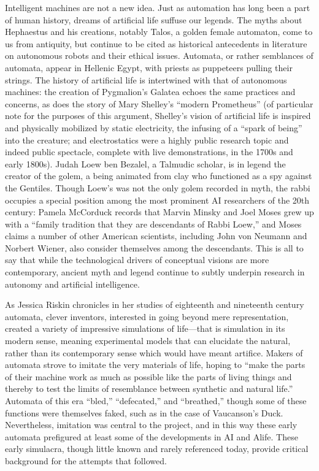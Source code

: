 Intelligent machines are not a new idea. Just as automation has long
been a part of human history, dreams of artificial life suffuse our
legends. The myths about Hephaestus and
his creations, notably Talos, a golden female automaton, come to us
from antiquity,\cite[Ch. 1]{mccorduck}  but continue to be cited as historical antecedents in
literature on autonomous robots and their ethical issues.\cite[p. 3]{patricklin} Automata,
or rather semblances of automata, appear in Hellenic Egypt, with
priests as puppeteers pulling their strings.\cite[Ch. 1]{mccorduck} The history of
artificial life is intertwined with that of autonomous machines: the
creation of Pygmalion's Galatea echoes the same practices and
concerns, as does the story of Mary Shelley's “modern Prometheus” (of
particular note for the purposes of this argument, Shelley's vision of
artificial life is inspired and physically mobilized by static
electricity, the infusing of a ``spark of being'' into the creature; and
electrostatics were a highly public research topic and indeed public
spectacle, complete with live demonstrations, in the 1700s and early
1800s).\cite[p. 44]{shelley} Judah Loew ben Bezalel, a Talmudic scholar, is in legend the
creator of the golem, a being animated from clay who functioned as a
spy against the Gentiles.\cite[Ch. 1]{mccorduck} Though Loew's was not the only golem
recorded in myth, the rabbi occupies a special position among the most
prominent AI researchers of the 20th century: Pamela McCorduck records
that Marvin Minsky and Joel Moses grew up with a ``family tradition
that they are descendants of Rabbi Loew,'' and Moses claims a number of
other American scientists, including John von Neumann and Norbert
Wiener, also consider themselves among the descendants.\cite[Ch. 1]{mccorduck} This is all
to say that while the technological drivers of conceptual visions are
more contemporary, ancient myth and legend continue to subtly underpin
research in autonomy and artificial intelligence.

As Jessica Riskin chronicles in her studies of eighteenth and
nineteenth century automata, clever inventors, interested in going
beyond mere representation, created a variety of impressive
simulations of life---that is simulation in its modern sense, meaning
experimental models that can elucidate the natural, rather than its
contemporary sense which would have meant artifice.\cite[p. 605--606]{riskinDuck}
Makers of automata strove to imitate the very materials of life,
hoping to ``make the parts of their machine work as much as possible
like the parts of living things and thereby to test the limits of
resemblance between synthetic and natural life.''\cite[p. 606]{riskinDuck}
Automata of this era ``bled,'' ``defecated,'' and ``breathed,'' though some
of these functions were themselves faked, such as in the case of
Vaucanson's Duck. Nevertheless, imitation was central to the project,
and in this way these early automata prefigured at least some of the
developments in AI and Alife. These early simulacra, though little known and
rarely referenced today, provide critical background for the attempts
that followed. 

